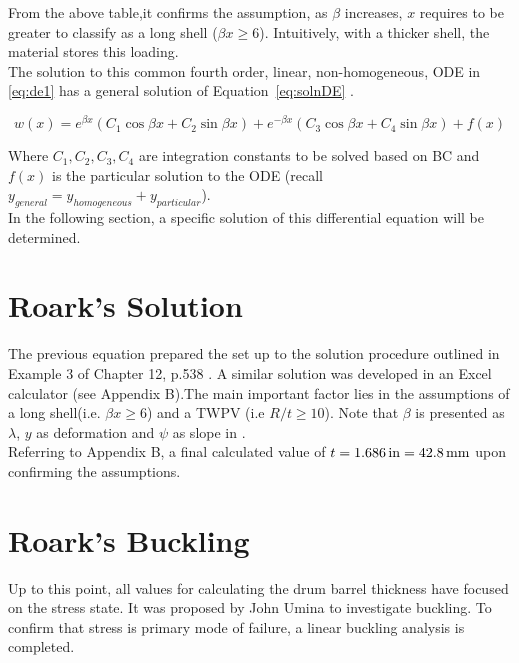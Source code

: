 From the above table,it confirms the assumption, as $\beta$ increases, $x$ requires to be greater to classify as a long shell ($\beta x \geq 6$). Intuitively, with a thicker shell, the material stores this loading.\\


The solution to this common fourth order, linear, non-homogeneous, ODE in \ref{eq:de1} has a general solution of Equation~\ref{eq:solnDE} \cite{timoshenko1959theory}.

\begin{equation}
	\label{eq:solnDE}
	w(x)=e^{\beta x} \left(C_1 \cos \beta x +C_2 \sin \beta x \right)+e^{-\beta x} \left(C_3 \cos \beta x +C_4 \sin \beta x \right) +f(x)
\end{equation}

Where $ C_1, C_2, C_3, C_4$ are integration constants to be solved based on BC and $f(x)$ is the particular solution to the ODE (recall $y_{general}=y_{homogeneous}+y_{particular}$).\\

In the following section, a specific solution of this differential equation will be determined.


\section{Roark's Solution}
\label{section:3_roark}

The previous equation prepared the set up to the solution procedure outlined in Example 3 of Chapter 12, p.538 \cite{roarks}. A similar solution was developed in an Excel \cite{EXCEL} calculator (see Appendix B).The main important factor lies in the assumptions of a long shell(i.e. $\beta x \geq 6$) and a TWPV (i.e $R/t \geq 10$). Note that $\beta$ is presented as $\lambda$, $y$ as deformation and $\psi$ as slope in \cite{roarks}.\\

Referring to Appendix B, a final calculated value of $t=1.686 \,\mathrm{in}= 42.8 \,\mathrm{mm}$ upon confirming the assumptions.

\section{Roark's Buckling}
\label{section:3_buckle}

Up to this point, all values for calculating the drum barrel thickness have focused on the stress state. It was proposed by John Umina to investigate buckling. To confirm that stress is primary mode of failure, a linear buckling analysis is completed.\\

